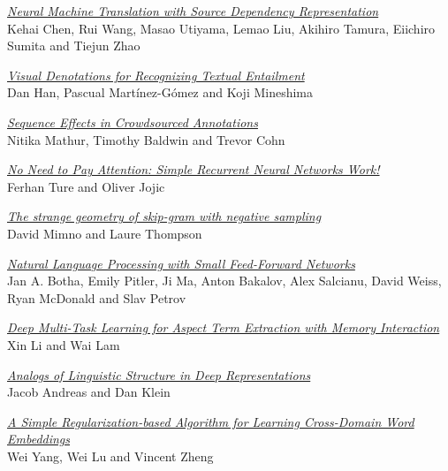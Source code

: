 \hyperlink{page.2829}{\em Neural Machine Translation with Source Dependency Representation}\samepage \\
\hspace*{7mm} Kehai Chen, Rui Wang, Masao Utiyama, Lemao Liu, Akihiro Tamura, Eiichiro Sumita and Tiejun Zhao\dotfill {}

\hyperlink{page.2836}{\em Visual Denotations for Recognizing Textual Entailment}\samepage \\
\hspace*{7mm} Dan Han, Pascual Mart\'{i}nez-G\'{o}mez and Koji Mineshima\dotfill {}

\hyperlink{page.2843}{\em Sequence Effects in Crowdsourced Annotations}\samepage \\
\hspace*{7mm} Nitika Mathur, Timothy Baldwin and Trevor Cohn\dotfill {}

\hyperlink{page.2849}{\em No Need to Pay Attention: Simple Recurrent Neural Networks Work!}\samepage \\
\hspace*{7mm} Ferhan Ture and Oliver Jojic\dotfill {}

\hyperlink{page.2856}{\em The strange geometry of skip-gram with negative sampling}\samepage \\
\hspace*{7mm} David Mimno and Laure Thompson\dotfill {}

\hyperlink{page.2862}{\em Natural Language Processing with Small Feed-Forward Networks}\samepage \\
\hspace*{7mm} Jan A. Botha, Emily Pitler, Ji Ma, Anton Bakalov, Alex Salcianu, David Weiss, Ryan McDonald and Slav Petrov\dotfill {}

\hyperlink{page.2869}{\em Deep Multi-Task Learning for Aspect Term Extraction with Memory Interaction}\samepage \\
\hspace*{7mm} Xin Li and Wai Lam\dotfill {}

\hyperlink{page.2876}{\em Analogs of Linguistic Structure in Deep Representations}\samepage \\
\hspace*{7mm} Jacob Andreas and Dan Klein\dotfill {}

\hyperlink{page.2881}{\em A Simple Regularization-based Algorithm for Learning Cross-Domain Word Embeddings}\samepage \\
\hspace*{7mm} Wei Yang, Wei Lu and Vincent Zheng\dotfill {}

